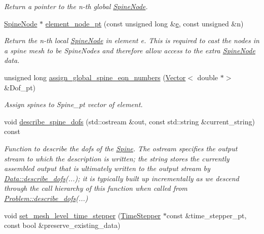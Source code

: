 \begin{DoxyCompactItemize}
\begin{DoxyCompactList}\small\item\em Return a pointer to the n-\/th global \hyperlink{classoomph_1_1SpineNode}{Spine\+Node}. \end{DoxyCompactList}\item 
\hyperlink{classoomph_1_1SpineNode}{Spine\+Node} $\ast$ \hyperlink{classoomph_1_1SpineMesh_aea36e8d0454965f9f96a3adc4a5a9371}{element\+\_\+node\+\_\+pt} (const unsigned long \&\hyperlink{cfortran_8h_a37cd013acc76697829c324bdd8562d82}{e}, const unsigned \&n)
\begin{DoxyCompactList}\small\item\em Return the n-\/th local \hyperlink{classoomph_1_1SpineNode}{Spine\+Node} in element e. This is required to cast the nodes in a spine mesh to be Spine\+Nodes and therefore allow access to the extra \hyperlink{classoomph_1_1SpineNode}{Spine\+Node} data. \end{DoxyCompactList}\item 
unsigned long \hyperlink{classoomph_1_1SpineMesh_ad743e349d74b24cc0e79fb4579229f13}{assign\+\_\+global\+\_\+spine\+\_\+eqn\+\_\+numbers} (\hyperlink{classoomph_1_1Vector}{Vector}$<$ double $\ast$$>$ \&Dof\+\_\+pt)
\begin{DoxyCompactList}\small\item\em Assign spines to Spine\+\_\+pt vector of element. \end{DoxyCompactList}\item 
void \hyperlink{classoomph_1_1SpineMesh_a94766043ec96db8388476b62556bad16}{describe\+\_\+spine\+\_\+dofs} (std\+::ostream \&out, const std\+::string \&current\+\_\+string) const
\begin{DoxyCompactList}\small\item\em Function to describe the dofs of the \hyperlink{classoomph_1_1Spine}{Spine}. The ostream specifies the output stream to which the description is written; the string stores the currently assembled output that is ultimately written to the output stream by \hyperlink{classoomph_1_1Data_a2dae16e2dcff9a40029f834c83364df5}{Data\+::describe\+\_\+dofs}(...); it is typically built up incrementally as we descend through the call hierarchy of this function when called from \hyperlink{classoomph_1_1Problem_abc103804eb319ae0b3d43870cc3e1eaf}{Problem\+::describe\+\_\+dofs}(...) \end{DoxyCompactList}\item 
void \hyperlink{classoomph_1_1SpineMesh_ad858479b2509532604bc48a184ad55a9}{set\+\_\+mesh\+\_\+level\+\_\+time\+\_\+stepper} (\hyperlink{classoomph_1_1TimeStepper}{Time\+Stepper} $\ast$const \&time\+\_\+stepper\+\_\+pt, const bool \&preserve\+\_\+existing\+\_\+data)
$$
\end{DoxyCompactItemize}
